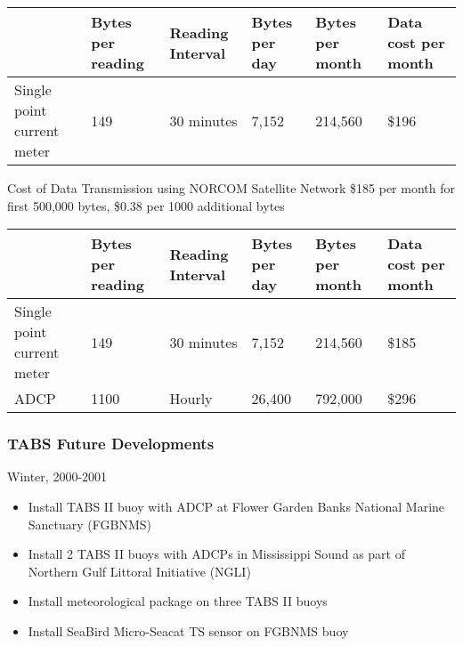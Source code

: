 \begin{center}
\begin{tabular}{|p{.75in}|p{.6in}|p{.6in}|p{.6in}|p{.6in}|p{.6in}|}  \hline
& \textbf{Bytes per reading} & \textbf{Reading Interval} & \textbf{Bytes per day} & \textbf{Bytes per month} & \textbf{Data cost per month} \\ \hline
Single point current meter &   149  &  30 minutes &  7,152  & 214,560 & \$196 \\ \hline
\end{tabular}
\end{center}


Cost of Data Transmission using NORCOM Satellite Network
\$185 per month for first 500,000 bytes,  \$0.38 per 1000 additional bytes

\begin{center}
\begin{tabular}{|p{.75in}|p{.6in}|p{.6in}|p{.6in}|p{.6in}|p{.6in}|}  \hline
& \textbf{Bytes per reading} & \textbf{Reading Interval} & \textbf{Bytes per day} & \textbf{Bytes per month} & \textbf{Data cost per month} \\ \hline
Single point current meter &   149  &  30 minutes &  7,152  & 214,560 & \$185 \\ \hline
ADCP &                        1100  &   Hourly    & 26,400  & 792,000 & \$296 \\ \hline
\end{tabular}
\end{center}


\subsubsection{TABS Future Developments}

Winter, 2000-2001

\begin{itemize}
\item Install TABS II buoy with ADCP at Flower Garden Banks National
  Marine Sanctuary (FGBNMS)

\item Install 2 TABS II buoys with ADCPs in Mississippi Sound as part
  of Northern Gulf Littoral Initiative (NGLI)

\item Install meteorological package on three TABS II buoys

\item Install SeaBird Micro-Seacat TS sensor on  FGBNMS buoy
\end{itemize}

